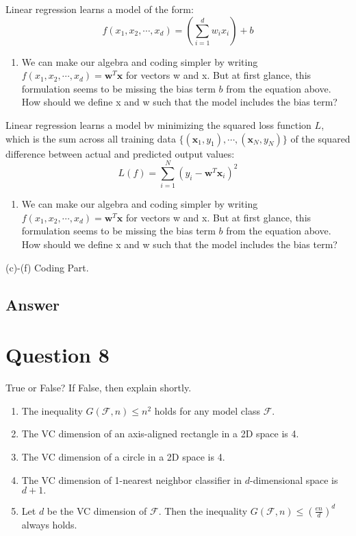 \documentclass[
	12pt, %
]{fphw}
\begin{document}
\begin{problem}
	Linear regression learns a model of the form:
	$$f\left(x_{1},x_{2},\cdots,x_{d}\right)=\left(\sum_{i=1}^{d}w_{i}x_{i}\right)+b$$
	\begin{enumerate}
	\item We can make our algebra and coding simpler by writing $f\left(x_1,x_2,\cdots,x_d\right)=\mathbf{w}^T\mathbf{x}$ for vectors w and x. But at first glance, this formulation seems to be missing the bias term $b$ from the equation above. How should we define x and w such that the model includes the bias term?
	
\end{enumerate}
\medskip
Linear regression learns a model bv minimizing the squared loss function $L$, which is the sum across all training data $\{(\mathbf{x}_1,y_1),\cdots,(\mathbf{x}_N,y_N)\}$ of the squared difference between actual and predicted output values:
$$L(f)=\sum_{i=1}^N\left(y_i-\mathbf{w}^T\mathbf{x}_i\right)^2$$
\begin{enumerate}
	\item We can make our algebra and coding simpler by writing $f\left(x_1,x_2,\cdots,x_d\right)=\mathbf{w}^T\mathbf{x}$ for vectors w and x. But at first glance, this formulation seems to be missing the bias term $b$ from the equation above. How should we define x and w such that the model includes the bias term?

\end{enumerate}
(c)-(f) Coding Part.
\end{problem}
\subsection*{Answer}

\section*{Question 8}

\begin{problem}
True or False? If False, then explain shortly.
\medskip
\begin{enumerate}
\item The inequality $G(\mathcal{F},n)\leq n^2$ holds for any model class $\mathcal{F}.$
\item The VC dimension of an axis-aligned rectangle in a 2D space is 4.
\item The VC dimension of a circle in a 2D space is 4.
\item The VC dimension of 1-nearest neighbor classifier in $d$-dimensional space is $d+1.$
\item Let $d$ be the VC dimension of $\mathcal{F}$. Then the inequality $G(\mathcal{F},n)\leq\left(\frac{en}d\right)^d$ always holds.
\end{enumerate}
\end{problem}
\end{document}
